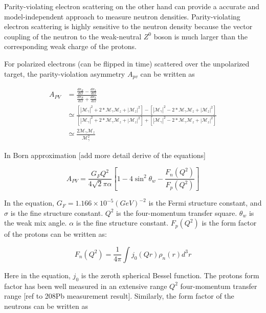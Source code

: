 Parity-violating electron scattering on the other hand can provide a accurate and model-independent approach to measure neutron densities. Parity-violating electron scattering is highly sensitive to the neutron density because the vector coupling of the neutron to the weak-neutral $Z^0$ boson is much larger than the corresponding weak charge of the protons. 

For polarized electrons (can be flipped in time) scattered over the unpolarized target, the parity-violation asymmetry $A_{pv}$ can be written as

\begin{equation}
\begin{split}
    A_{PV} &= \frac{\frac{d\sigma_R}{d\Omega} - \frac{d\sigma_L}{d\Omega}}{\frac{d\sigma_R}{d\Omega} + \frac{d\sigma_L}{d\Omega}} \\
    & \simeq \frac{[|\mathcal{M}_{\gamma}|^2 + 2*\mathcal{M}_{\gamma}\mathcal{M}_z + |\mathcal{M}_z|^2] - [|\mathcal{M}_{\gamma}|^2 - 2*\mathcal{M}_{\gamma}\mathcal{M}_z + |\mathcal{M}_z|^2]}{[|\mathcal{M}_{\gamma}|^2 + 2*\mathcal{M}_{\gamma}\mathcal{M}_z + |\mathcal{M}_z|^2] + [|\mathcal{M}_{\gamma}|^2 - 2*\mathcal{M}_{\gamma}\mathcal{M}_z + |\mathcal{M}_z|^2]} \\
    & \simeq \frac{2\mathcal{M}_{\gamma}\mathcal{M}_z}{\mathcal{M}_{\gamma}^2}
\end{split}
\end{equation}

In Born approximation [add more detail derive of the equations]

\begin{equation}
    A_{PV} = \frac{G_FQ^2}{4\sqrt{2}\pi\alpha}[1-4\sin^2{\theta_w} - \frac{F_n(Q^2)}{F_p(Q^2)}]
\end{equation}


In the equation, $G_F = 1.166 \times 10^{-5} (GeV)^{-2}$ is the Fermi structure constant, and $\sigma$ is the fine structure constant. $Q^2$ is the four-momentum transfer square. $\theta_w$ is the weak mix angle.   $\alpha$ is the fine structure constant. $F_p(Q^2)$ is the form factor of the protons can be written as:

\begin{equation}
    F_n(Q^2) = \frac{1}{4\pi}\int j_0(Qr)\rho_n(r)d^3r
\end{equation}

Here in the equation, $j_0$ is the zeroth spherical Bessel function. The protons form factor has been well measured in an extensive range $Q^2$ four-momentum transfer range [ref to 208Pb measurement result]. Similarly, the form factor of the neutrons can be written as

